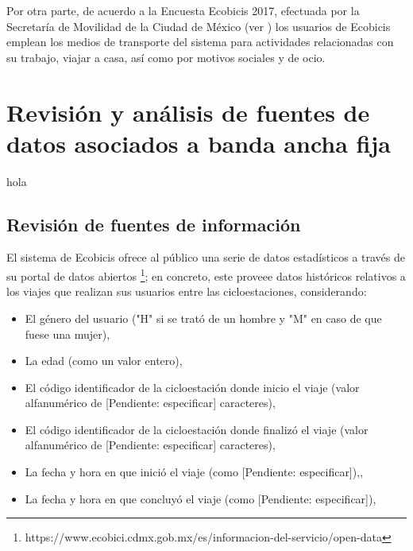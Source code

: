 \documentclass[9pt,twocolumn,twoside]{ilcss}
\begin{document}
Por otra parte, de acuerdo a la Encuesta Ecobicis 2017, efectuada por la Secretaría de Movilidad de la Ciudad de México (ver \cite{Ecobicis2017}) los usuarios de Ecobicis emplean los medios de transporte del sistema para actividades relacionadas con su trabajo, viajar a casa, así como por motivos sociales y de ocio.

\section{Revisión y análisis de fuentes de datos asociados a banda ancha fija}

hola

\subsection{Revisión de fuentes de información}

El sistema de Ecobicis ofrece al público una serie de datos estadísticos a través de su portal de datos abiertos \footnote{https://www.ecobici.cdmx.gob.mx/es/informacion-del-servicio/open-data}; en concreto, este proveee datos históricos relativos a los viajes que realizan sus usuarios entre las cicloestaciones, considerando:
\begin{itemize}
	\item El género del usuario ("H" si se trató de un hombre y "M" en caso de que fuese una mujer), \vspace{-0.2cm}
	\item La edad (como un valor entero),\vspace{-0.2cm}
	\item El código identificador de la cicloestación donde inicio el viaje (valor alfanumérico de [Pendiente: especificar] caracteres),\vspace{-0.2cm}
	\item El código identificador de la cicloestación donde finalizó el viaje (valor alfanumérico de [Pendiente: especificar] caracteres),\vspace{-0.2cm}
	\item La fecha y hora en que inició el viaje (como [Pendiente: especificar]),\vspace{-0.2cm},
	\item La fecha y hora en que concluyó el viaje (como [Pendiente: especificar]),\vspace{-0.2cm}
	
\end{itemize}
\end{document}
